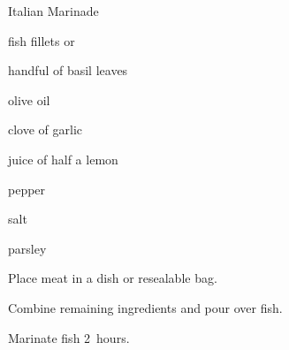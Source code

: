 \begin{recipe}{Italian Marinade}{}{}

\begin{ingredients}
\item fish fillets or 
\item handful of basil leaves
\item {} olive oil
\item clove of garlic
\item juice of half a lemon
\item pepper
\item salt
\item parsley
\end{ingredients}

\begin{directions}
\item Place meat in a dish or resealable bag.
\item Combine remaining ingredients and pour over fish.
\item Marinate fish 2~hours.
\end{directions}

\end{recipe}
